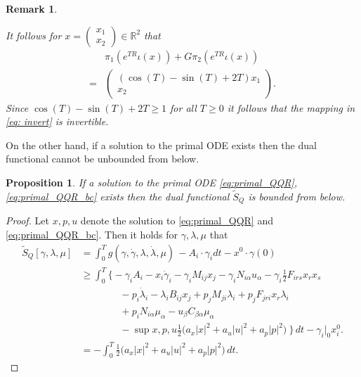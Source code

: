 \documentclass[11pt]{article}
\newcommand{\R}{\mathbb R}
\newcommand{\half}{\frac{1}{2}}
\newtheorem{proposition}{Proposition}[section]
\newtheorem{remark}{Remark}[section]
\begin{document}
\begin{remark}
\begin{enumerate}
It follows for $x = \begin{pmatrix} x_1 \\ x_2 \end{pmatrix} \in \R^2$ that
\begin{align}
    &\pi_1 (e^{TR}  \iota(x)) + G \pi_2 (e^{TR} \iota(x)) \\
    =& \begin{pmatrix} (\cos(T) - \sin(T) + 2T) x_1 \\ x_2  \end{pmatrix}.
\end{align}
Since $\cos(T) - \sin(T) + 2T \geq 1$ for all $T \geq 0$ it follows that the mapping in \eqref{eq: invert} is invertible.

\end{enumerate}
\end{remark}


On the other hand, if a solution to the primal ODE exists then the dual functional cannot be unbounded from below.

\begin{proposition}
    If a solution to the primal ODE \eqref{eq:primal_QQR}, \eqref{eq:primal_QQR_bc} exists then the dual functional $\tilde{S}_Q$ is bounded from below.
\end{proposition}
\begin{proof}
    Let $x,p,u$ denote the solution to \eqref{eq:primal_QQR} and \eqref{eq:primal_QQR_bc}. Then it holds for $\gamma, \lambda, \mu$ that
    \begin{align*}
        \tilde{S}_Q[\gamma,\lambda,\mu] &= \int_0^T g(\gamma,\dot{\gamma}, \lambda, \dot{\lambda}, \mu) \, - A_i \cdot \gamma_i dt - x^0 \cdot \gamma(0) \\
        &\geq \int_0^T  \Big\{ - \gamma_i  A_i - x_i \dot{\gamma}_i - \gamma_i M_{ij} x_j - \gamma_i N_{i \alpha} u_\alpha - \gamma_i \half F_{irs} x_r x_s \\
        & \qquad \qquad  - p_i \dot{\lambda}_i - \lambda_i B_{ij} x_j + p_j M_{ji} \lambda_i + p_j F_{jri} x_r \lambda_i\\
        & \qquad \qquad +  p_i N_{i \alpha} \mu_\alpha -  u_\beta C_{\beta \alpha} \mu_\alpha\\
        & \qquad \qquad - \sup{x,p,u} \half \Big( a_x |x |^2 + a_u |u |^2 + a_p |p |^2 \Big) \ \Big\} \, dt - \gamma_i|_0 x^0_i. \\
        &= - \int_0^T \half \Big( a_x  |x |^2 + a_u |u |^2 + a_p |p |^2 \Big) \, dt.
    \end{align*}
\end{proof}
\end{document}
